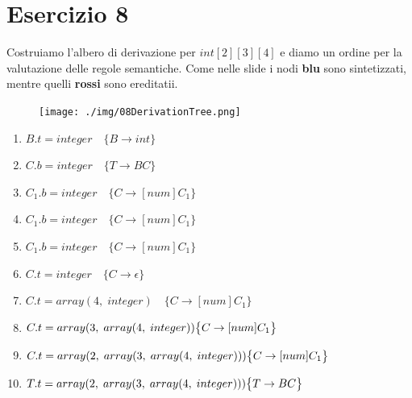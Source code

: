 \documentclass[11pt]{article}
\begin{document}
\section*{Esercizio 8}
Costruiamo l'albero di derivazione per $int[2][3][4]$ e diamo un ordine per la valutazione delle regole semantiche.
Come nelle slide i nodi {\color{blue} \textbf{blu}} sono sintetizzati, mentre quelli {\color {red} \textbf{rossi}} 
sono ereditatii. 
\begin{center}
  \begin{minipage}[t]{\linewidth}
    \begin{multicols}{2}
      \begin{figure}[H]
        \texttt{[image: ./img/08DerivationTree.png]}
      \end{figure}
      \begin{enumerate}
        \small 
        \item $B.t = integer \quad \big \{B \rightarrow int\big\}$ 
        \item $C.b = integer \quad \big \{T \rightarrow BC\big\}$
        \item $C_1.b = integer \quad \big \{C \rightarrow [num]C_1\big\}$
        \item $C_1.b = integer \quad \big \{C \rightarrow [num]C_1\big\}$
        \item $C_1.b = integer \quad \big \{C \rightarrow [num]C_1\big\}$
        \item $C.t = integer \quad \big \{C \rightarrow \epsilon\big\}$
        \item $C.t = array(4,\; integer)\quad \big \{C \rightarrow [num]C_1\big\}$
        \item $C.t = array(3,\;array(4,\;integer)) \newline \big \{C \rightarrow [num]C_1\big\}$
        \item $C.t = array(2,\;array(3,\;array(4,\;integer)))
        \newline \big \{C \rightarrow [num]C_1\big\}$
        \item  $T.t = array(2,\;array(3,\;array(4,\;integer))) \newline \big \{T \rightarrow BC \big\}$
      \end{enumerate}
    \end{multicols}
  \end{minipage}
\end{center}
\end{document}
